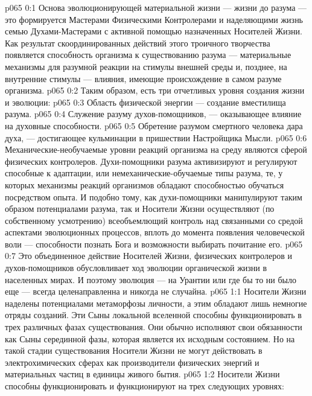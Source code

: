 \author{Носитель Жизни}
\vs p065 0:1 Основа эволюционирующей материальной жизни --- жизни до разума --- это формируется Мастерами Физическими Контролерами и наделяющими жизнь семью Духами\hyp{}Мастерами с активной помощью назначенных Носителей Жизни. Как результат скоординированных действий этого троичного творчества появляется способность организма к существованию разума --- материальные механизмы для разумной реакции на стимулы внешней среды и, позднее, на внутренние стимулы --- влияния, имеющие происхождение в самом разуме организма.
\vs p065 0:2 \pc Таким образом, есть три отчетливых уровня создания жизни и эволюции:
\vs p065 0:3 \bibnobreakspace Область физической энергии --- создание вместилища разума.
\vs p065 0:4 \bibnobreakspace Служение разуму духов\hyp{}помощников, --- оказывающее влияние на духовные способности.
\vs p065 0:5 \bibnobreakspace Обретение разумом смертного человека дара духа, --- достигающее кульминации в пришествии Настройщика Мысли.
\vs p065 0:6 \pc Механические\hyp{}необучаемые уровни реакций организма на среду являются сферой физических контролеров. Духи\hyp{}помощники разума активизируют и регулируют способные к адаптации, или немеханические\hyp{}обучаемые типы разума, те, у которых механизмы реакций организмов обладают способностью обучаться посредством опыта. И подобно тому, как духи\hyp{}помощники манипулируют таким образом потенциалами разума, так и Носители Жизни осуществляют (по собственному усмотрению) всеобъемлющий контроль над связанными со средой аспектами эволюционных процессов, вплоть до момента появления человеческой воли --- способности познать Бога и возможности выбирать почитание его.
\vs p065 0:7 Это объединенное действие Носителей Жизни, физических контролеров и духов\hyp{}помощников обусловливает ход эволюции органической жизни в населенных мирах. И поэтому эволюция --- на Урантии или где бы то ни было еще --- всегда целенаправленна и никогда не случайна.
\vs p065 1:1 Носители Жизни наделены потенциалами метаморфозы личности, а этим обладают лишь немногие отряды созданий. Эти Сыны локальной вселенной способны функционировать в трех различных фазах существования. Они обычно исполняют свои обязанности как Сыны серединной фазы, которая является их исходным состоянием. Но на такой стадии существования Носители Жизни не могут действовать в электрохимических сферах как производители физических энергий и материальных частиц в единицы живого бытия.
\vs p065 1:2 Носители Жизни способны функционировать и функционируют на трех следующих уровнях:
